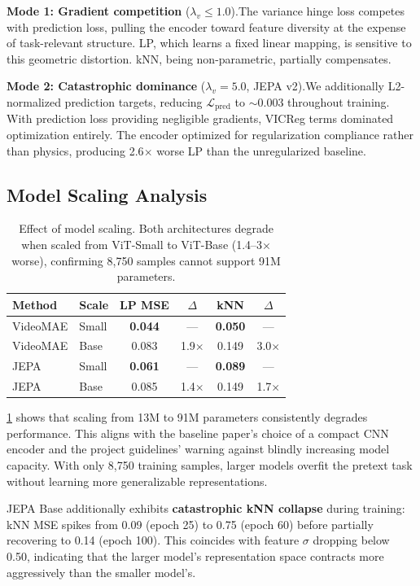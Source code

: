 \documentclass{article}
\begin{document}
\textbf{Mode 1: Gradient competition} ($\lambda_v \leq 1.0$).\quad The variance hinge loss competes with prediction loss, pulling the encoder toward feature diversity at the expense of task-relevant structure. LP, which learns a fixed linear mapping, is sensitive to this geometric distortion. kNN, being non-parametric, partially compensates.

\textbf{Mode 2: Catastrophic dominance} ($\lambda_v = 5.0$, JEPA v2).\quad We additionally L2-normalized prediction targets, reducing $\mathcal{L}_{\text{pred}}$ to ${\sim}0.003$ throughout training. With prediction loss providing negligible gradients, VICReg terms dominated optimization entirely. The encoder optimized for regularization compliance rather than physics, producing 2.6$\times$ worse LP than the unregularized baseline.

\subsection{Model Scaling Analysis}

\begin{table}[t]
\caption{Effect of model scaling. Both architectures degrade when scaled from ViT-Small to ViT-Base (1.4--3$\times$ worse), confirming 8{,}750 samples cannot support 91M parameters.}
\label{tab:scaling}
\vskip 0.1in
\centering
\small
\begin{tabular}{@{}llcccc@{}}
\toprule
Method & Scale & LP MSE & $\Delta$ & kNN & $\Delta$ \\
\midrule
VideoMAE & Small & \textbf{0.044} & --- & \textbf{0.050} & --- \\
VideoMAE & Base & 0.083 & 1.9$\times$ & 0.149 & 3.0$\times$ \\
\midrule
JEPA & Small & \textbf{0.061} & --- & \textbf{0.089} & --- \\
JEPA & Base & 0.085 & 1.4$\times$ & 0.149 & 1.7$\times$ \\
\bottomrule
\end{tabular}
\vskip -0.1in
\end{table}

\cref{tab:scaling} shows that scaling from 13M to 91M parameters consistently degrades performance. This aligns with the baseline paper's choice of a compact CNN encoder and the project guidelines' warning against blindly increasing model capacity. With only 8{,}750 training samples, larger models overfit the pretext task without learning more generalizable representations.

JEPA Base additionally exhibits \textbf{catastrophic kNN collapse} during training: kNN MSE spikes from 0.09 (epoch 25) to 0.75 (epoch 60) before partially recovering to 0.14 (epoch 100). This coincides with feature $\sigma$ dropping below 0.50, indicating that the larger model's representation space contracts more aggressively than the smaller model's.
\end{document}
